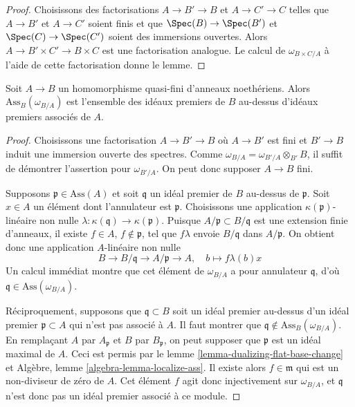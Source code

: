 \begin{proof}
Choisissons des factorisations $A \to B' \to B$ et $A \to C' \to C$ telles que
$A \to B'$ et $A \to C'$ soient finis et que $\Spec(B) \to \Spec(B')$
et $\Spec(C) \to \Spec(C')$ soient des immersions ouvertes. Alors
$A \to B' \times C' \to B \times C$ est une factorisation analogue.
Le calcul de $\omega_{B \times C/A}$ à l'aide de cette factorisation
donne le lemme.
\end{proof}

\begin{lemma}
\label{lemma-dualizing-associated-primes}
Soit $A \to B$ un homomorphisme quasi-fini d'anneaux noethériens.
Alors $\text{Ass}_B(\omega_{B/A})$ est l'ensemble des idéaux premiers de $B$
au-dessus d'idéaux premiers associés de $A$.
\end{lemma}

\begin{proof}
Choisissons une factorisation $A \to B' \to B$ où $A \to B'$ est fini et
$B' \to B$ induit une immersion ouverte des spectres. Comme
$\omega_{B/A} = \omega_{B'/A} \otimes_{B'} B$, il suffit
de démontrer l'assertion pour $\omega_{B'/A}$. On peut donc supposer $A \to B$
fini.

\medskip\noindent
Supposons $\mathfrak p \in \text{Ass}(A)$ et soit $\mathfrak q$ un idéal premier
de $B$ au-dessus de $\mathfrak p$. Soit $x \in A$ un élément dont
l'annulateur est $\mathfrak p$. Choisissons une application $\kappa(\mathfrak p)$-linéaire
non nulle $\lambda : \kappa(\mathfrak q) \to \kappa(\mathfrak p)$.
Puisque $A/\mathfrak p \subset B/\mathfrak q$ est une extension finie
d'anneaux, il existe $f \in A$, $f \not \in \mathfrak p$,
tel que $f\lambda$ envoie $B/\mathfrak q$ dans $A/\mathfrak p$.
On obtient donc une application $A$-linéaire non nulle
$$
B \to B/\mathfrak q \to A/\mathfrak p \to A,\quad
b \mapsto f\lambda(b)x
$$
Un calcul immédiat montre que cet élément de $\omega_{B/A}$
a pour annulateur $\mathfrak q$, d'où
$\mathfrak q \in \text{Ass}(\omega_{B/A})$.

\medskip\noindent
Réciproquement, supposons que $\mathfrak q \subset B$ soit un idéal premier
au-dessus d'un idéal premier $\mathfrak p \subset A$ qui n'est pas associé
à $A$. Il faut montrer que
$\mathfrak q \not \in \text{Ass}_B(\omega_{B/A})$.
En remplaçant $A$ par $A_\mathfrak p$ et $B$ par
$B_\mathfrak p$, on peut supposer que $\mathfrak p$ est un idéal maximal
de $A$. Ceci est permis par le lemme \ref{lemma-dualizing-flat-base-change} et
Algèbre, lemme \ref{algebra-lemma-localize-ass}.
Il existe alors $f \in \mathfrak m$
qui est un non-diviseur de zéro de $A$.
Cet élément $f$ agit donc injectivement sur $\omega_{B/A}$,
et $\mathfrak q$ n'est donc pas un idéal premier associé à ce module.
\end{proof}


